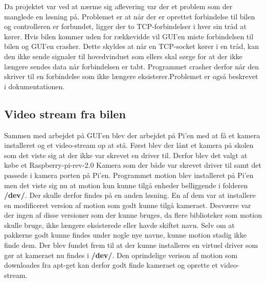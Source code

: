 Da projektet var ved at nærme sig aflevering var der et problem som der manglede en løsning på. Problemet er at når der er oprettet forbindelse til bilen og controlleren er forbundet, ligger der to TCP-forbindelser i hver sin tråd at kører. Hvis bilen kommer uden for rækkevidde vil GUI’en miste forbindelsen til bilen og GUI’en crasher. Dette skyldes at når en TCP-socket kører i en tråd, kan den ikke sende signaler til hovedvinduet som ellers skal sørge for at der ikke længere sendes data når forbindelsen er tabt. Programmet crasher derfor når den skriver til en forbindelse som ikke længere eksisterer.Problemet er også beskrevet i dokumentationen. 

\subsection{Video stream fra bilen}
Sammen med arbejdet på GUI’en blev der arbejdet på Pi’en med at få et kamera installeret og et video-stream op at stå. Først blev der lånt et kamera på skolen som det viste sig at der ikke var skrevet en driver til. Derfor blev det valgt at købe et Raspberry-pi-rev-2.0 Kamera som der både var skrevet driver til samt det passede i kamera porten på Pi’en. Programmet motion blev installeret på Pi’en men det viste sig nu at motion kun kunne tilgå enheder belliggende i folderen \textbf{\//dev/}. Der skulle derfor findes på en anden løsning. En af dem var at installere en modificeret version af motion \cite{lib:motion-on-raspberry} som godt kunne tilgå kameraet. Desværre var der ingen af disse versioner som der kunne bruges, da flere biblioteker som motion skulle bruge, ikke længere eksisterede eller havde skiftet navn. Selv om at pakkerne godt kunne findes under nogle nye navne, kunne motion stadig ikke finde dem. Der blev fundet frem til at der kunne installeres en virtuel driver \cite{lib:camera-driver} som gør at kameraet nu findes i \textbf{\//dev/}. Den oprindelige verison af motion som downloades fra apt-get kan derfor godt finde kameraet og oprette et video-stream. 

\clearpage